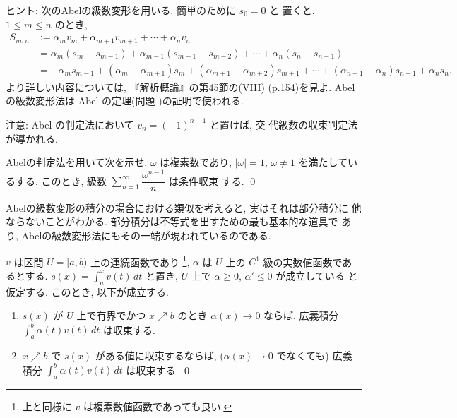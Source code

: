 \documentclass[12pt,twoside]{jarticle}
\begin{document}
\noindent ヒント: 次のAbelの級数変形を用いる. 簡単のために $s_0=0$ と
置くと, $1\le m \le n$ のとき,
\begin{align*}
  S_{m,n}
  & := \alpha_m v_m + \alpha_{m+1} v_{m+1} + \cdots + \alpha_n v_n
\\
  & =
  \alpha_m     (s_m     - s_{m-1}) +
  \alpha_{m-1} (s_{m-1} - s_{m-2}) +
  \cdots +
  \alpha_n     (s_n     - s_{n-1})
\\
  & =
                - \alpha_{m}    s_{m-1} +
  (\alpha_m     - \alpha_{m+1}) s_m     + 
  (\alpha_{m+1} - \alpha_{m+2}) s_{m+1} +
  \cdots +
  (\alpha_{n-1} - \alpha_{n}  ) s_{n-1} +
   \alpha_{n}                   s_n.
\end{align*}
より詳しい内容については, 『解析概論』の第45節の(VIII) (p.154)を見よ.
Abel の級数変形法は Abel の定理(問題 )の証明で使われる.

\noindent 注意: Abel の判定法において $v_{n}=(-1)^{n-1}$ と置けば, 交
代級数の収束判定法が導かれる. 

\begin{question}
  Abelの判定法を用いて次を示せ. %
  $\omega$ は複素数であり, $|\omega|=1$, $\omega\ne1$
  を満たしているする. このとき, %
  級数 $\sum\limits_{n=1}^\infty \dfrac{\omega^{n-1}}{n}$ は条件収束
  する.  \qed
\end{question}

Abelの級数変形の積分の場合における類似を考えると, 実はそれは部分積分に
他ならないことがわかる. 部分積分は不等式を出すための最も基本的な道具で
あり, Abelの級数変形法にもその一端が現われているのである.

\begin{question}[Abelの判定法の広義積分版]\qstar{*}
  $v$ は区間 $U=[a,b)$ 上の連続函数であり%
  \footnote{上と同様に $v$ は複素数値函数であっても良い.}, %
  $\alpha$ は $U$ 上の $C^1$ 級の実数値函数であるとする. %
  $s(x) = \int_a^x v(t)\,dt$ と置き, %
  $U$ 上で $\alpha \ge 0$, $\alpha' \le 0$ が成立している
  と仮定する. このとき, 以下が成立する.
  \begin{enumerate}
  \item $s(x)$ が $U$ 上で有界でかつ %
    $x\nearrow b$ のとき $\alpha(x) \to 0$ ならば, %
    広義積分 $\int_a^b \alpha(t)v(t)\,dt$ は収束する.
  \item $x\nearrow b$ で $s(x)$ がある値に収束するならば, %
    ($\alpha(x) \to 0$ でなくても) %
    広義積分 $\int_a^b \alpha(t)v(t)\,dt$ は収束する.
    \qed
  \end{enumerate}
\end{question}
\end{document}
